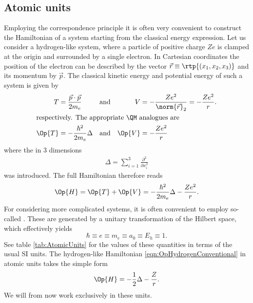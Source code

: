 \subsection{Atomic units}
Employing the correspondence principle it is often very convenient
to construct the \QM Hamiltonian of a system starting
from the classical energy expression.
Let us consider a hydrogen-like system,
where a particle of positive charge $Ze$
is clamped at the origin and surrounded by a single electron.
In Cartesian coordinates the position of the electron can be described
by the vector $\vec{r} \equiv \rtp{(x_1, x_2, x_3)}$ and its momentum by $\vec{p}$.
The classical kinetic energy and potential energy of such a system
is given by
\begin{align}
	T &= \frac{\vec{p} \cdot \vec{p}}{2 m_e} &
	&\text{and}&
	V &= - \frac{Ze^2}{\norm{\vec{r}}_2} = - \frac{Ze^2}{r}. \\
\intertext{respectively. The appropriate \QM analogues are}
	\Op{T} &= -\frac{\hbar^2}{2 m_e} \Delta &
	&\text{and}&
	\Op{V} &= - \frac{Ze^2}{r}
	\label{eqn:OpHydrogenConventional}
\end{align}
where the  in $3$ dimensions
\begin{align}
	\Delta = \sum_{i=1}^3 \frac{\partial^2}{\partial x_i^2}
	\label{eqn:LaplaceOperatorHydrogen}
\end{align}
was introduced. The full Hamiltonian therefore reads
\begin{equation}
	\Op{H} = \Op{T} + \Op{V} = -\frac{\hbar^2}{2 m_e} \Delta - \frac{Ze^2}{r}.
	\label{eqn:OpHydrogenFullUnits}
\end{equation}
For considering more complicated systems,
it is often convenient to employ so-called .
These are generated by a unitary transformation of the Hilbert space,
which effectively yields
\[ \hbar \equiv e \equiv m_e \equiv a_0 \equiv E_h \equiv 1. \]
See table \vref{tab:AtomicUnits} for the values of these quantities
in terms of the usual SI units.
The hydrogen-like Hamiltonian \vref{eqn:OpHydrogenConventional}
in atomic units takes the simple form
\begin{equation}
	\Op{H} = -\frac12 \Delta - \frac{Z}{r}.
	\label{eqn:OpHydrogen}
\end{equation}
We will from now work exclusively in these units.
